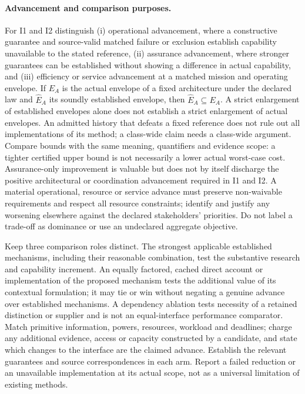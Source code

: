 \documentclass[11pt]{article}
\begin{document}
\paragraph{Advancement and comparison purposes.} For I1 and I2 distinguish (i) operational advancement, where a constructive guarantee and source-valid matched failure or exclusion establish capability unavailable to the stated reference, (ii) assurance advancement, where stronger guarantees can be established without showing a difference in actual capability, and (iii) efficiency or service advancement at a matched mission and operating envelope. If $E_A$ is the actual envelope of a fixed architecture under the declared law and $\widehat E_A$ its soundly established envelope, then $\widehat E_A\subseteq E_A$. A strict enlargement of established envelopes alone does not establish a strict enlargement of actual envelopes. An admitted history that defeats a fixed reference does not rule out all implementations of its method; a class-wide claim needs a class-wide argument. Compare bounds with the same meaning, quantifiers and evidence scope: a tighter certified upper bound is not necessarily a lower actual worst-case cost. Assurance-only improvement is valuable but does not by itself discharge the positive architectural or coordination advancement required in I1 and I2. A material operational, resource or service advance must preserve non-waivable requirements and respect all resource constraints; identify and justify any worsening elsewhere against the declared stakeholders' priorities. Do not label a trade-off as dominance or use an undeclared aggregate objective.

Keep three comparison roles distinct. The strongest applicable established mechanisms, including their reasonable combination, test the substantive research and capability increment. An equally factored, cached direct account or implementation of the proposed mechanism tests the additional value of its contextual formulation; it may tie or win without negating a genuine advance over established mechanisms. A dependency ablation tests necessity of a retained distinction or supplier and is not an equal-interface performance comparator. Match primitive information, powers, resources, workload and deadlines; charge any additional evidence, access or capacity constructed by a candidate, and state which changes to the interface are the claimed advance. Establish the relevant guarantees and source correspondences in each arm. Report a failed reduction or an unavailable implementation at its actual scope, not as a universal limitation of existing methods.
\end{document}
